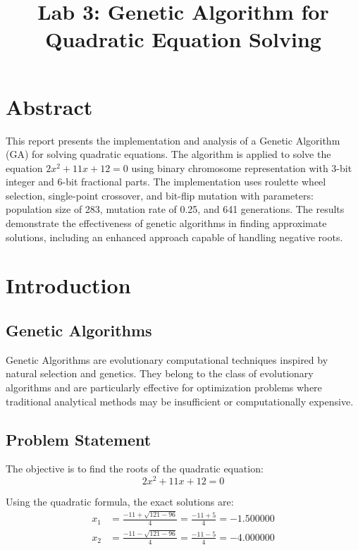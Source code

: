 \documentclass[11pt,a4paper]{article}
\begin{document}
\title{\textbf{Lab 3: Genetic Algorithm for Quadratic Equation Solving}}
\date{}

\maketitle

\section{Abstract}
This report presents the implementation and analysis of a Genetic Algorithm (GA) for solving quadratic equations. The algorithm is applied to solve the equation $2x^2 + 11x + 12 = 0$ using binary chromosome representation with 3-bit integer and 6-bit fractional parts. The implementation uses roulette wheel selection, single-point crossover, and bit-flip mutation with parameters: population size of 283, mutation rate of 0.25, and 641 generations. The results demonstrate the effectiveness of genetic algorithms in finding approximate solutions, including an enhanced approach capable of handling negative roots.

\section{Introduction}

\subsection{Genetic Algorithms}
Genetic Algorithms are evolutionary computational techniques inspired by natural selection and genetics. They belong to the class of evolutionary algorithms and are particularly effective for optimization problems where traditional analytical methods may be insufficient or computationally expensive.

\subsection{Problem Statement}
The objective is to find the roots of the quadratic equation:
\begin{equation}
2x^2 + 11x + 12 = 0
\end{equation}

Using the quadratic formula, the exact solutions are:
\begin{align}
x_1 &= \frac{-11 + \sqrt{121 - 96}}{4} = \frac{-11 + 5}{4} = -1.500000 \\
x_2 &= \frac{-11 - \sqrt{121 - 96}}{4} = \frac{-11 - 5}{4} = -4.000000
\end{align}
\end{document}
